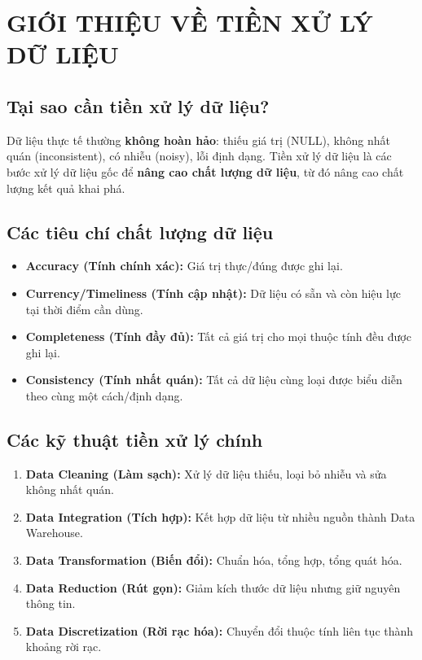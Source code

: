 \documentclass[10pt]{article}
\begin{document}
\onehalfspacing
\renewcommand{\arraystretch}{1.5}

\newcommand{\ChapterNum}{2}
\newcommand{\ChapterTitle}{TIỀN XỬ LÝ DỮ LIỆU (DATA PREPROCESSING)}


\section{GIỚI THIỆU VỀ TIỀN XỬ LÝ DỮ LIỆU}

\subsection{Tại sao cần tiền xử lý dữ liệu?}

Dữ liệu thực tế thường \textbf{không hoàn hảo}: thiếu giá trị (NULL), không nhất quán (inconsistent), có nhiễu (noisy), lỗi định dạng. Tiền xử lý dữ liệu là các bước xử lý dữ liệu gốc để \textbf{nâng cao chất lượng dữ liệu}, từ đó nâng cao chất lượng kết quả khai phá.

\subsection{Các tiêu chí chất lượng dữ liệu}

\begin{itemize}
    \item \textbf{Accuracy (Tính chính xác):} Giá trị thực/đúng được ghi lại.
    \item \textbf{Currency/Timeliness (Tính cập nhật):} Dữ liệu có sẵn và còn hiệu lực tại thời điểm cần dùng.
    \item \textbf{Completeness (Tính đầy đủ):} Tất cả giá trị cho mọi thuộc tính đều được ghi lại.
    \item \textbf{Consistency (Tính nhất quán):} Tất cả dữ liệu cùng loại được biểu diễn theo cùng một cách/định dạng.
\end{itemize}

\subsection{Các kỹ thuật tiền xử lý chính}

\begin{enumerate}
    \item \textbf{Data Cleaning (Làm sạch):} Xử lý dữ liệu thiếu, loại bỏ nhiễu và sửa không nhất quán.
    \item \textbf{Data Integration (Tích hợp):} Kết hợp dữ liệu từ nhiều nguồn thành Data Warehouse.
    \item \textbf{Data Transformation (Biến đổi):} Chuẩn hóa, tổng hợp, tổng quát hóa.
    \item \textbf{Data Reduction (Rút gọn):} Giảm kích thước dữ liệu nhưng giữ nguyên thông tin.
    \item \textbf{Data Discretization (Rời rạc hóa):} Chuyển đổi thuộc tính liên tục thành khoảng rời rạc.
\end{enumerate}
\end{document}
